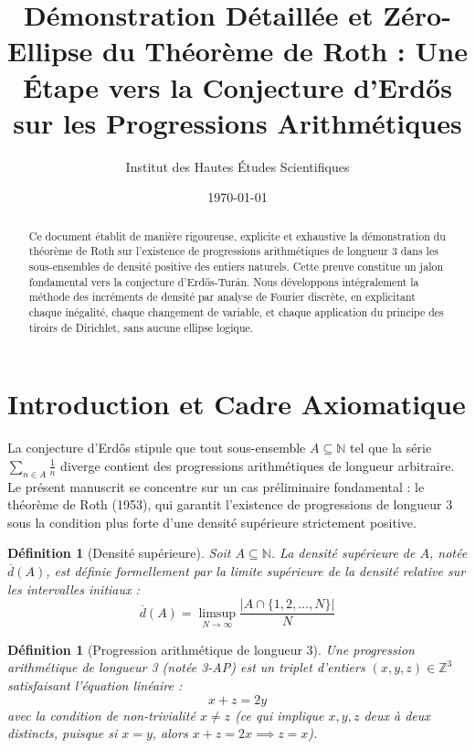 \documentclass[12pt, a4paper]{article}
\title{Démonstration Détaillée et Zéro-Ellipse du Théorème de Roth : Une Étape vers la Conjecture d'Erd\H{o}s sur les Progressions Arithmétiques}
\author{Institut des Hautes Études Scientifiques}
\date{\today}
\newtheorem{definition}[theorem]{Définition}
\begin{document}
\maketitle

\begin{abstract}
Ce document établit de manière rigoureuse, explicite et exhaustive la démonstration du théorème de Roth sur l'existence de progressions arithmétiques de longueur 3 dans les sous-ensembles de densité positive des entiers naturels. Cette preuve constitue un jalon fondamental vers la conjecture d'Erd\H{o}s-Turán. Nous développons intégralement la méthode des incréments de densité par analyse de Fourier discrète, en explicitant chaque inégalité, chaque changement de variable, et chaque application du principe des tiroirs de Dirichlet, sans aucune ellipse logique.
\end{abstract}

\tableofcontents
\newpage

\section{Introduction et Cadre Axiomatique}

La conjecture d'Erd\H{o}s stipule que tout sous-ensemble $A \subseteq \mathbb{N}$ tel que la série $\sum_{n \in A} \frac{1}{n}$ diverge contient des progressions arithmétiques de longueur arbitraire. Le présent manuscrit se concentre sur un cas préliminaire fondamental : le théorème de Roth (1953), qui garantit l'existence de progressions de longueur 3 sous la condition plus forte d'une densité supérieure strictement positive.

\begin{definition}[Densité supérieure]
Soit $A \subseteq \mathbb{N}$. La densité supérieure de $A$, notée $\overline{d}(A)$, est définie formellement par la limite supérieure de la densité relative sur les intervalles initiaux :
\begin{equation}
\overline{d}(A) = \limsup_{N \to \infty} \frac{|A \cap \{1, 2, \dots, N\}|}{N}
\end{equation}
\end{definition}

\begin{definition}[Progression arithmétique de longueur 3]
Une progression arithmétique de longueur 3 (notée 3-AP) est un triplet d'entiers $(x, y, z) \in \mathbb{Z}^3$ satisfaisant l'équation linéaire :
\begin{equation}
x + z = 2y
\end{equation}
avec la condition de non-trivialité $x \neq z$ (ce qui implique $x, y, z$ deux à deux distincts, puisque si $x = y$, alors $x+z = 2x \implies z = x$).
\end{definition}
\end{document}
